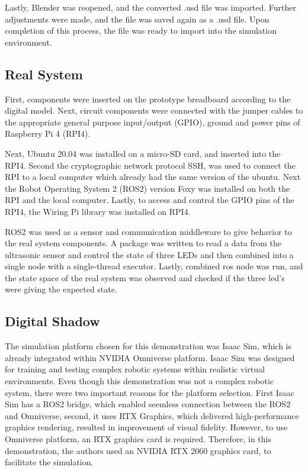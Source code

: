 \documentclass[conference]{IEEEtran}
\begin{document}
    Lastly, Blender was reopened, and the converted .usd file was imported. 
    Further  adjustments were made, and the file was saved  again as a .usd file. 
    Upon completion of this process, the file was ready to import into the simulation environment.
    \subsection*{Real System}\label{section:real_system}
    First, components were inserted on the prototype breadboard according to the digital model.
    Next, circuit components were connected with the jumper cables to the appropriate general 
    purpose input/output (GPIO), ground and power pins of Raspberry Pi 4 (RPI4). 

    Next, Ubuntu 20.04 was installed on a micro-SD card,  and inserted into the RPI4.
    Second  the cryptographic network protocol SSH, was used to connect the RPI to a local computer 
    which already had the same version of the ubuntu. Next the Robot Operating System 2 (ROS2) 
    version Foxy was installed on both the RPI and the local computer. 
    Lastly, to access and control the GPIO pins of the RPI4, the Wiring Pi library was installed on RPI4.

    ROS2 was used as a sensor and communication middleware to give 
    behavior to the real system components. A package was written
    to read a data from the ultrasonic sensor and control the state of three LEDs 
    and then combined into a single node with a single-thread executor. 
    Lastly, combined ros node was run, and the state space of the real system was observed and 
    checked if the three led's were giving the expected state.

    \subsection*{Digital Shadow}\label{section:digital_shadow}

    The simulation platform chosen for this demonstration was Isaac Sim, 
    which is already integrated within NVIDIA Omniverse platform. 
    Isaac Sim was designed for training and testing complex robotic systems within realistic virtual environments. 
    Even though this demonstration was not a complex robotic system, there were two important 
    reasons for the platform selection. First Isaac Sim has a ROS2 bridge, which enabled seemless 
    connection between the ROS2 and Omniverse, second, it uses RTX Graphics, which delivered 
    high-performance graphics rendering, resulted in improvement of visual fidelity. 
    However, to use Omniverse platform, an RTX graphics card is required. 
    Therefore,  in this demonstration, the authors used an NVIDIA RTX 2060 graphics card, to 
    facilitate the simulation. 
\end{document}
